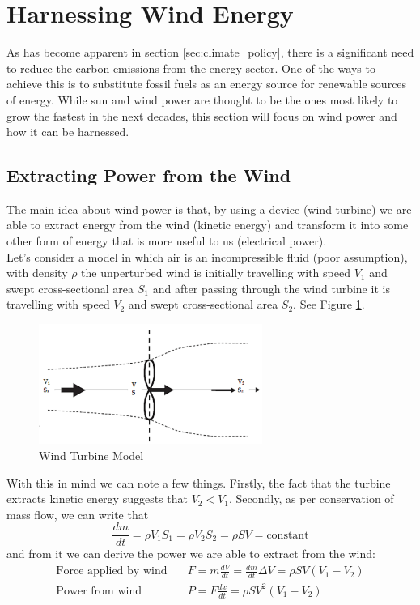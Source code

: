 \section{Harnessing Wind Energy}
\label{sec:harnessing_wind}

As has become apparent in section \ref{sec:climate_policy}, there is a significant
need to reduce the carbon emissions from the energy sector. One of the ways to
achieve this is to substitute fossil fuels as an energy source for renewable
sources of energy. While sun and wind power are thought to be the ones most likely
to grow the fastest in the next decades, this section will focus on wind power
and how it can be harnessed. 

\subsection{Extracting Power from the Wind}
\label{sec:extracting_power_from_wind}

The main idea about wind power is that, by using a device (wind turbine) we are 
able to extract energy from the wind (kinetic energy) and transform it into some
other form of energy that is more useful to us (electrical power).\\

Let's consider a model in which air is an incompressible fluid (poor assumption),
with density $\rho$
the unperturbed wind is initially travelling with speed $V_1$ and swept cross-sectional
area $S_1$ and after passing through the wind turbine it is travelling with speed
$V_2$ and swept cross-sectional area $S_2$. See Figure \ref{fig:wind_turbine_model}.

\begin{figure}[ht]
    \centering
    \includegraphics[width=0.65\textwidth]{figures/wind_turbine_model.png}
    \caption{Wind Turbine Model}
    \label{fig:wind_turbine_model}
\end{figure}

\noindent With this in mind we can note a few things. Firstly, the fact that the
turbine extracts kinetic energy suggests that $V_2 < V_1$. Secondly, as per conservation
of mass flow, we can write that
$$
\frac{dm}{dt} = \rho V_1 S_1 = \rho V_2 S_2 = \rho SV = \text{constant}
$$
and from it we can derive the power we are able to extract from the wind:
\begin{align*}
    \text{Force applied by wind} \quad & F = m \frac{dV}{dt} = \frac{dm}{dt} \Delta V
    = \rho SV (V_1 - V_2) \\
    \text{Power from wind} \quad & P = F \frac{dx}{dt} = \rho SV^2(V_1 - V_2)
\end{align*}

